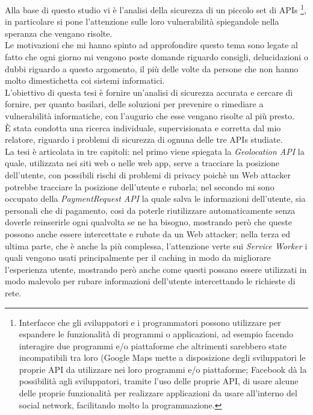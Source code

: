 \documentclass[11pt ,a4paper , twoside , openright ]{book}
\begin{document}
	Alla base di questo studio vi è l'analisi della sicurezza di un piccolo set di APIs \footnote{Interfacce che gli sviluppatori e i programmatori possono utilizzare per espandere le funzionalità di programmi o applicazioni, ad esempio facendo interagire due programmi e/o piattaforme che altrimenti sarebbero state incompatibili tra loro (Google Maps mette a disposizione degli sviluppatori le proprie API da utilizzare nei loro programmi e/o piattaforme; Facebook dà la possibilità agli sviluppatori, tramite l'uso delle proprie API, di usare alcune delle proprie funzionalità per realizzare applicazioni da usare all'interno del social network, facilitando molto la programmazione.}, in particolare si pone l'attenzione sulle loro vulnerabilità spiegandole nella speranza che vengano risolte.
	\\
	Le motivazioni che mi hanno spinto ad approfondire questo tema sono legate al fatto che ogni giorno mi vengono poste domande riguardo consigli, delucidazioni o dubbi riguardo a questo argomento, il più delle volte da persone che non hanno molto dimestichetta coi sistemi informatici.
	\\
	L'obiettivo di questa tesi è fornire un'analisi di sicurezza accurata e cercare di fornire, per quanto basilari, delle soluzioni per prevenire o rimediare a vulnerabilità informatiche, con l'augurio che esse vengano risolte al più presto.
	\\
	È stata condotta una ricerca individuale, supervisionata e corretta dal mio relatore, riguardo i problemi di sicurezza di ognuna delle tre APIs studiate.
	\\
	La tesi è articolata in tre capitoli: nel primo viene spiegata la \textit{Geolocation API} \cite{rif2} la quale, utilizzata nei siti web o nelle web app, serve a tracciare la posizione dell'utente, con possibili rischi di problemi di privacy poichè un Web attacker potrebbe tracciare la posizione dell'utente e rubarla; nel secondo mi sono occupato della \textit{PaymentRequest API} \cite{rif1} la quale salva le informazioni dell'utente, sia personali che di pagamento, cosi da poterle riutilizzare automaticamente senza doverle reinserirle ogni qualvolta se ne ha bisogno, mostrando però che queste possono anche essere intercettate e rubate da un Web attacker; nella terza ed ultima parte, che è anche la più complessa, l'attenzione verte sui \textit{Service Worker} i quali vengono usati principalmente per il caching in modo da migliorare l'esperienza utente, mostrando però anche come questi possano essere utilizzati in modo malevolo per rubare informazioni dell'utente intercettando le richieste di rete.
\end{document}
